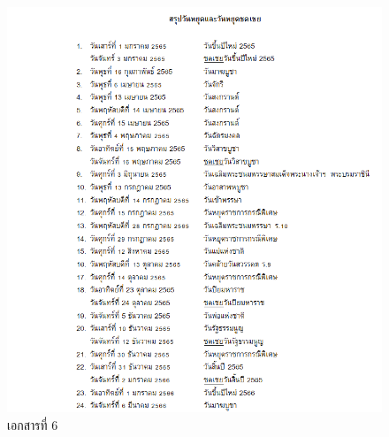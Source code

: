 \begin{enumerate}
\begin{figure}[h]
              \includegraphics[width=1\textwidth]{holiday.png}
              \caption{เอกสารที่ 6}
              \label{fig: holiday}
          \end{figure}
\end{enumerate}








